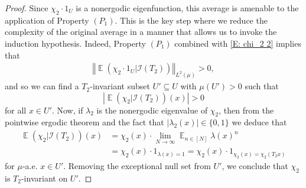 \documentclass[11pt]{amsart}
\theoremstyle{definition}
\DeclareMathOperator*{\E}{\mathbb{E}}
\newcommand{\CI}{{\mathcal I}}
\newcommand{\norm}[1]{\left\Vert #1\right\Vert}
\newcommand{\1}{{\mathbf{1}}}
\newcommand{\abs}[1]{\mathopen{}\left| #1\mathclose{}\right|}
\begin{document}
\begin{proof}
     Since $\chi_2\cdot 1_U$ is a nonergodic eigenfunction, this average is amenable to the application of Property $(P_1)$. This is the key step where we reduce the complexity of the original average in a manner that allows us to invoke the induction hypothesis.
     Indeed, Property $(P_1)$ combined with \eqref{E: chi_2 2} implies that 
     \begin{align*}%
         \norm{\E(\chi_2\cdot 1_U|\CI(T_2))}_{L^2(\mu)}>0,
     \end{align*} 
     and so we can find a $T_2$-invariant subset $U'\subseteq U$ with $\mu(U')>0$ such that $$\abs{\E(\chi_2|\CI(T_2))(x)}>0$$ for all $x\in U'$. Now, if $\lambda_2$ is the nonergodic eigenvalue of $\chi_2$, then from the pointwise ergodic theorem and the fact that $|\lambda_2(x)|\in\{0,1\}$ we deduce that
     \begin{equation}\label{E: projection of eigenfunction}
         \begin{split}
         \E(\chi_2|\CI(T_2))(x) &= \chi_2(x)\cdot \lim_{N\to\infty}\E_{n\in[N]}\lambda(x)^n\\ &= \chi_2(x)\cdot 1_{\lambda(x)=1} = \chi_2(x)\cdot 1_{\chi_2(x) = \chi_2(T_2 x)}    
         \end{split}
     \end{equation}
     for $\mu$-a.e. $x\in U'$. Removing the exceptional null set from $U'$, we conclude that $\chi_2$ is $T_2$-invariant on $U'$. 
     

\end{proof}
\end{document}
